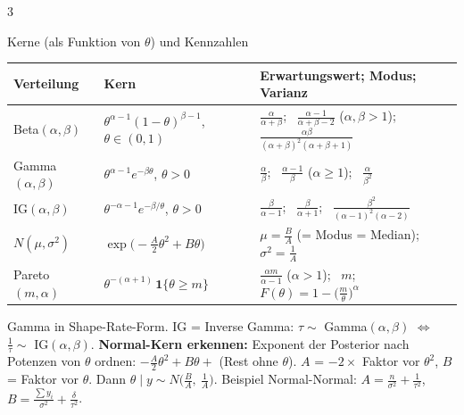 \documentclass[8pt,a4paper,landscape]{extarticle}
\newcommand{\ind}{\mathbf{1}}
\begin{document}
\begin{multicols*}{3}
\begin{werkzeug}{Kerne (als Funktion von $\theta$) und Kennzahlen}
{\begin{tabularx}{\linewidth}{@{}>{\raggedright\arraybackslash}p{1.95cm}>{\raggedright\arraybackslash}p{2.55cm}>{\raggedright\arraybackslash}X@{}}
\toprule
Verteilung & Kern & Erwartungswert; Modus; Varianz \\
\midrule
Beta$(\alpha,\beta)$ & $\theta^{\alpha-1}(1-\theta)^{\beta-1}$, $\theta\in(0,1)$ & $\frac{\alpha}{\alpha+\beta}$; \ $\frac{\alpha-1}{\alpha+\beta-2}$ ($\alpha,\beta>1$); \ $\frac{\alpha\beta}{(\alpha+\beta)^2(\alpha+\beta+1)}$ \\
Gamma$(\alpha,\beta)$ & $\theta^{\alpha-1}e^{-\beta\theta}$, $\theta>0$ & $\frac\alpha\beta$; \ $\frac{\alpha-1}{\beta}$ ($\alpha\ge 1$); \ $\frac{\alpha}{\beta^2}$ \\
IG$(\alpha,\beta)$ & $\theta^{-\alpha-1}e^{-\beta/\theta}$, $\theta>0$ & $\frac{\beta}{\alpha-1}$; \ $\frac{\beta}{\alpha+1}$; \ $\frac{\beta^2}{(\alpha-1)^2(\alpha-2)}$ \\
$N(\mu,\sigma^2)$ & $\exp\!\big(-\frac{A}{2}\theta^2+B\theta\big)$ & $\mu=\frac BA$ (= Modus = Median); \ $\sigma^2=\frac1A$ \\
Pareto$(m,\alpha)$ & $\theta^{-(\alpha+1)}\,\ind\{\theta\ge m\}$ & $\frac{\alpha m}{\alpha-1}$ ($\alpha>1$); \ $m$; \ $F(\theta)=1-\big(\frac m\theta\big)^\alpha$ \\
\bottomrule
\end{tabularx}}
Gamma in Shape-Rate-Form. IG = Inverse Gamma: $\tau\sim$ Gamma$(\alpha,\beta)$ $\Leftrightarrow$ $\frac1\tau\sim$ IG$(\alpha,\beta)$.
\textbf{Normal-Kern erkennen:} Exponent der Posterior nach Potenzen von $\theta$ ordnen: $-\frac A2\theta^2+B\theta+$ (Rest ohne $\theta$). $A$ = $-2\times$ Faktor vor $\theta^2$, $B$ = Faktor vor $\theta$. Dann $\theta\mid y\sim N\big(\frac BA,\ \frac1A\big)$. Beispiel Normal-Normal: $A=\frac{n}{\sigma^2}+\frac{1}{\tau^2}$, $B=\frac{\sum y_i}{\sigma^2}+\frac{\delta}{\tau^2}$.
\end{werkzeug}


\end{multicols*}
\end{document}
